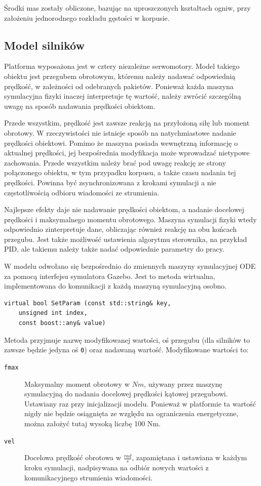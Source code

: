 		Środki mas zostały obliczone, bazując na uproszczonych kształtach ogniw, przy założeniu jednorodnego rozkładu gęstości w korpusie.
		
	\subsection{Model silników}
		Platforma wyposażona jest w cztery niezależne serwomotory. 
		Model takiego obiektu jest przegubem obrotowym, któremu należy nadawać odpowiednią prędkość, w zależności od odebranych pakietów.
		Ponieważ każda maszyna symulacyjna fizyki inaczej interpretuje tę wartość, należy zwrócić szczególną uwagę na sposób nadawania prędkości obiektom.
		
		Przede wszystkim, prędkość jest zawsze reakcją na przyłożoną siłę lub moment obrotowy. W rzeczywistości nie istnieje sposób na natychmiastowe nadanie prędkości obiektowi.
		Pomimo że maszyna posiada wewnętrzną informację o aktualnej prędkości,
		jej bezpośrednia modyfikacja może wprowadzać nietypowe zachowania. Przede wszystkim należy brać pod uwagę reakcję ze strony połączonego obiektu, w tym przypadku korpusu,
		a także czasu nadania tej prędkości. Powinna być zsynchronizowana z krokami symulacji a nie częstotliwością odbioru wiadomości ze strumienia.
		
		Najlepsze efekty daje nie nadawanie prędkości obiektom, a nadanie docelowej prędkości i maksymalnego momentu obrotowego.
		Maszyna symulacji fizyki wtedy odpowiednio zinterpretuje dane, obliczając również reakcję na obu końcach przegubu.
		Jest także możliwość ustawienia algorytmu sterownika, na przykład PID, ale takiemu należy także nadać odpowiednie parametry do pracy.
		
		W modelu odwołano się bezpośrednio do zmiennych maszyny symulacyjnej ODE za pomocą interfejsu symulatora Gazebo.
		Jest to metoda wirtualna, implementowana do komunikacji z każdą maszyną symulacyjną osobno.
		\begin{verbatim}
virtual bool SetParam (const std::string& key,
	unsigned int index,
	const boost::any& value)
		\end{verbatim}
		Metoda przyjmuje nazwę modyfikowanej wartości, oś przegubu (dla silników to zawsze będzie jedyna oś \texttt{0}) oraz nadawaną wartość.
		Modyfikowane wartości to:
		\begin{description}
			\item[\texttt{fmax}] Maksymalny moment obrotowy w $Nm$, używany przez maszynę symulacyjną do nadania docelowej prędkości kątowej przegubowi. Ustawiany raz przy inicjalizacji modelu. Ponieważ w platformie ta wartość nigdy nie będzie osiągnięta ze względu na ograniczenia energetyczne, można założyć tutaj wysoką liczbę 100 Nm.
			\item[\texttt{vel}] Docelowa prędkość obrotowa w $\frac{rad}{s}$, zapamiętana i ustawiana w każdym kroku symulacji, nadpisywana na odbiór nowych wartości z komunikacyjnego strumienia wiadomości.
		\end{description}
	
